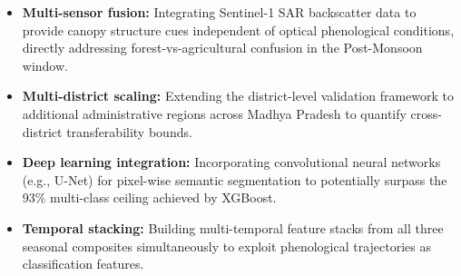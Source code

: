 \documentclass[12pt, a4paper, twocolumn]{article}
\begin{document}
\begin{itemize}
    \item \textbf{Multi-sensor fusion:} Integrating Sentinel-1 SAR backscatter data to provide canopy structure cues independent of optical phenological conditions, directly addressing forest-vs-agricultural confusion in the Post-Monsoon window.
    \item \textbf{Multi-district scaling:} Extending the district-level validation framework to additional administrative regions across Madhya Pradesh to quantify cross-district transferability bounds.
    \item \textbf{Deep learning integration:} Incorporating convolutional neural networks (e.g., U-Net) for pixel-wise semantic segmentation to potentially surpass the 93\% multi-class ceiling achieved by XGBoost.
    \item \textbf{Temporal stacking:} Building multi-temporal feature stacks from all three seasonal composites simultaneously to exploit phenological trajectories as classification features.
\end{itemize}
\end{document}
